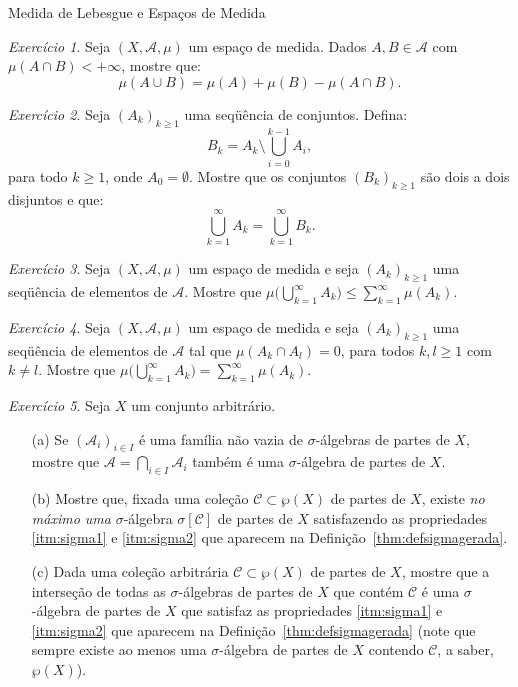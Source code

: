 \documentclass[oneside,final,11pt]{amsbook}
\theoremstyle{remark}\newtheorem{exercise}{Exercício}[chapter]
\theoremstyle{remark}\newtheorem{*exercise}[exercise]{\hbox to 0pt{\hskip 0pt minus 1fil*}Exercício}
\theoremstyle{definition}\newtheorem{exdefin}{Definição}[chapter]
\theoremstyle{plain}\newtheorem{teo}{Teorema}[section]
\theoremstyle{plain}\newtheorem{lem}[teo]{Lema}
\theoremstyle{plain}\newtheorem{prop}[teo]{Proposição}
\theoremstyle{plain}\newtheorem{cor}[teo]{Corolário}
\theoremstyle{definition}\newtheorem{defin}[teo]{Definição}
\theoremstyle{remark}\newtheorem{rem}[teo]{Observação}
\theoremstyle{definition}\newtheorem{notation}[teo]{Notação}
\theoremstyle{definition}\newtheorem{convention}[teo]{Convenção}
\theoremstyle{definition}\newtheorem{example}[teo]{Exemplo}
\numberwithin{section}{chapter}
\numberwithin{equation}{section}
\begin{document}
\begin{chapter}{Medida de Lebesgue e Espaços de Medida}
\begin{exercise}\label{exe:muAcupB}
Seja $(X,\mathcal A,\mu)$ um espaço de medida. Dados $A,B\in\mathcal A$ com $\mu(A\cap B)<+\infty$,
mostre que:
\[\mu(A\cup B)=\mu(A)+\mu(B)-\mu(A\cap B).\]
\end{exercise}

\begin{exercise}\label{exe:disjuntar}
Seja $(A_k)_{k\ge1}$ uma seqüência de conjuntos. Defina:
\[B_k=A_k\setminus\bigcup_{i=0}^{k-1}A_i,\]
para todo $k\ge1$, onde $A_0=\emptyset$. Mostre que
os conjuntos $(B_k)_{k\ge1}$ são dois a dois disjuntos e que:
\[\bigcup_{k=1}^\infty A_k=\bigcup_{k=1}^\infty B_k.\]
\end{exercise}

\begin{exercise}\label{exe:musubad}
Seja $(X,\mathcal A,\mu)$ um espaço de medida e seja $(A_k)_{k\ge1}$ uma seqüência de elementos
de $\mathcal A$. Mostre que $\mu\big(\bigcup_{k=1}^\infty A_k\big)\le\sum_{k=1}^\infty\mu(A_k)$.
\end{exercise}

\begin{exercise}\label{exe:quasedisjuntos}
Seja $(X,\mathcal A,\mu)$ um espaço de medida e seja $(A_k)_{k\ge1}$ uma seqüência de elementos
de $\mathcal A$ tal que $\mu(A_k\cap A_l)=0$, para todos $k,l\ge1$ com $k\ne l$. Mostre que
$\mu\big(\bigcup_{k=1}^\infty A_k\big)=\sum_{k=1}^\infty\mu(A_k)$.
\end{exercise}

\begin{exercise}\label{exe:sigmagerada}
Seja $X$ um conjunto arbitrário.
\begin{itemize}
\item[(a)] Se $(\mathcal A_i)_{i\in I}$ é uma família não vazia de $\sigma$-álgebras de partes de $X$, mostre que
$\mathcal A=\bigcap_{i\in I}\mathcal A_i$ também é uma $\sigma$-álgebra de partes de $X$.
\item[(b)] Mostre que, fixada uma coleção $\mathcal C\subset\wp(X)$ de partes de $X$, existe {\em no máximo uma\/}
$\sigma$-álgebra $\sigma[\mathcal C]$ de partes de $X$ satisfazendo as propriedades \eqref{itm:sigma1} e
\eqref{itm:sigma2} que aparecem na Definição~\ref{thm:defsigmagerada}.
\item[(c)] Dada uma coleção arbitrária $\mathcal C\subset\wp(X)$ de partes de $X$, mostre que a interseção de todas
as $\sigma$-álgebras de partes de $X$ que contém $\mathcal C$ é uma $\sigma$-álgebra de partes
de $X$ que satisfaz as propriedades \eqref{itm:sigma1} e
\eqref{itm:sigma2} que aparecem na Definição~\ref{thm:defsigmagerada} (note que sempre existe
ao menos uma $\sigma$-álgebra de partes de $X$ contendo $\mathcal C$, a saber, $\wp(X)$).
\end{itemize}
\end{exercise}


\end{chapter}
\end{document}
